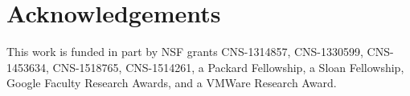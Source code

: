 \section*{Acknowledgements}

This work is funded in part by NSF grants CNS-1314857, CNS-1330599, CNS-1453634, CNS-1518765, CNS-1514261, a Packard Fellowship, a Sloan Fellowship, Google Faculty Research Awards, and a VMWare Research Award.